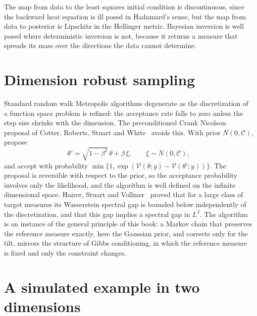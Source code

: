 The map from data to the least squares initial condition is discontinuous, since the backward heat equation is ill posed in Hadamard's sense, but the map from data to posterior is Lipschitz in the Hellinger metric. Bayesian inversion is well posed where deterministic inversion is not, because it returns a measure that spreads its mass over the directions the data cannot determine.

\section{Dimension robust sampling}\label{sec:dimrobust}

Standard random walk Metropolis algorithms degenerate as the discretization of a function space problem is refined: the acceptance rate falls to zero unless the step size shrinks with the dimension. The preconditioned Crank Nicolson proposal of Cotter, Roberts, Stuart and White~\cite{cotter2013} avoids this. With prior $N(0,\mathcal{C})$, propose
\[
\theta' = \sqrt{1-\beta^2}\,\theta+\beta\,\xi,\qquad\xi\sim N(0,\mathcal{C}),
\]
and accept with probability $\min\{1,\exp(\mathcal{V}(\theta;y)-\mathcal{V}(\theta';y))\}$. The proposal is reversible with respect to the prior, so the acceptance probability involves only the likelihood, and the algorithm is well defined on the infinite dimensional space. Hairer, Stuart and Vollmer~\cite{hairer2014} proved that for a large class of target measures its Wasserstein spectral gap is bounded below independently of the discretization, and that this gap implies a spectral gap in $L^2$. The algorithm is an instance of the general principle of this book: a Markov chain that preserves the reference measure exactly, here the Gaussian prior, and corrects only for the tilt, mirrors the structure of Gibbs conditioning, in which the reference measure is fixed and only the constraint changes.

\section{A simulated example in two dimensions}\label{sec:simns2d}

